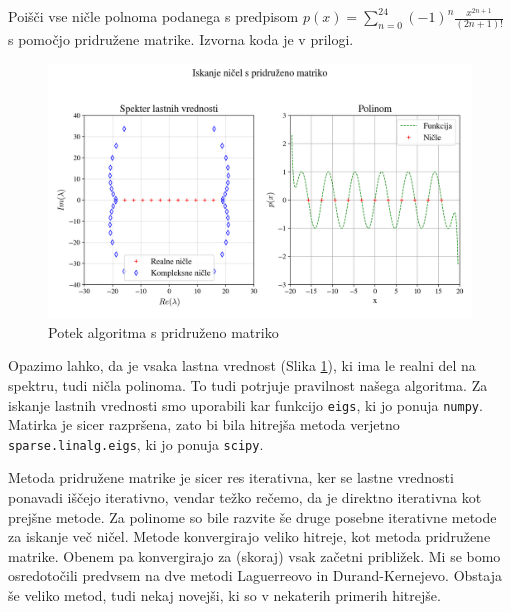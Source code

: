 \begin{primer}
    Poišči vse ničle polnoma podanega s predpisom $p(x) = \sum_{n=0}^{24} (-1)^n \frac{x^{2n+1}}{(2n+1)!}$ s pomočjo pridružene matrike. Izvorna koda je v prilogi.
    \begin{figure}[H]
    \centering
    \includegraphics[width=1\textwidth]{img/eigenvalue.png}
    \caption{Potek algoritma s pridruženo matriko}
    \label{fig:companionmatrix}
\end{figure}
Opazimo lahko, da je vsaka lastna vrednost (Slika \ref{fig:companionmatrix}), ki ima le realni del na spektru, tudi ničla polinoma. To tudi potrjuje pravilnost našega algoritma. Za iskanje lastnih vrednosti smo uporabili kar funkcijo \texttt{eigs}, ki jo ponuja \texttt{numpy}. Matirka je sicer razpršena, zato bi bila hitrejša metoda verjetno \texttt{sparse.linalg.eigs}, ki jo ponuja \texttt{scipy}.
\end{primer}
Metoda pridružene matrike je sicer res iterativna, ker se lastne vrednosti ponavadi iščejo iterativno, vendar težko rečemo, da je direktno iterativna kot prejšne metode. Za polinome so bile razvite še druge posebne iterativne metode za iskanje več ničel. Metode konvergirajo veliko hitreje, kot metoda pridružene matrike. Obenem pa konvergirajo za (skoraj) vsak začetni približek. Mi se bomo osredotočili predvsem na dve metodi Laguerreovo in Durand-Kernejevo. Obstaja še veliko metod, tudi nekaj novejši, ki so v nekaterih primerih hitrejše.
